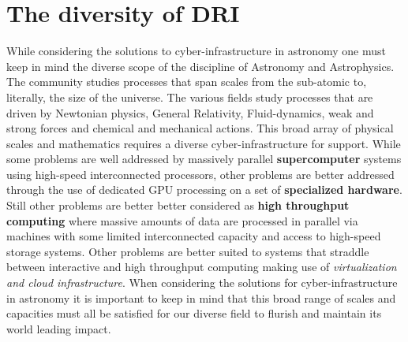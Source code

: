 \documentclass[11pt]{article}
\begin{document}
\section{The diversity of DRI}
While considering the solutions to cyber-infrastructure in astronomy one must keep in mind the diverse scope of the discipline of Astronomy and Astrophysics. The community studies processes that span scales from the sub-atomic to, literally, the size of the universe.  
The various fields study processes that are driven by Newtonian physics, General Relativity, Fluid-dynamics, weak and strong forces and chemical and mechanical actions. 
This broad array of physical scales and mathematics requires a diverse cyber-infrastructure for support.
While some problems are well addressed by massively parallel {\bf supercomputer} systems using high-speed interconnected processors, other problems are better addressed through the use of dedicated GPU processing on a set of {\bf specialized hardware}.  
Still other problems are better better considered as {\bf high throughput computing} where massive amounts of data are processed in parallel via machines with some limited interconnected capacity and access to high-speed storage systems.  
Other problems are better suited to systems that straddle between interactive and high throughput computing making use of {\em virtualization and cloud infrastructure}.
When considering the solutions for cyber-infrastructure in astronomy it is important to keep in mind that this broad range of scales and capacities must all be satisfied for our diverse field to flurish and maintain its world leading impact.
\end{document}
